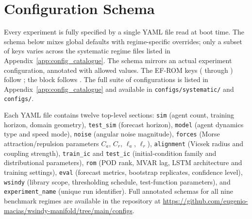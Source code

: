 \chapter{Configuration Schema}
\label{app:config_schema}
Every experiment is fully specified by a single YAML file read at boot time.
The schema below mixes global defaults with regime-specific
overrides; only a subset of keys varies across the systematic regime files
listed in Appendix~\ref{app:config_catalogue}.
The schema mirrors an actual experiment configuration,
annotated with allowed values.
The EF-ROM keys ( through ) follow
; the  block follows
.
The full suite of configurations is listed in Appendix~\ref{app:config_catalogue}
and available in \texttt{configs/systematic/} and \texttt{configs/}.

Each YAML file contains twelve top-level sections:
\texttt{sim} (agent count, training horizon, domain geometry),
\texttt{test\_sim} (forecast horizon),
\texttt{model} (agent dynamics type and speed mode),
\texttt{noise} (angular noise magnitude),
\texttt{forces} (Morse attraction/repulsion parameters $C_a$, $C_r$, $\ell_a$, $\ell_r$),
\texttt{alignment} (Vicsek radius and coupling strength),
\texttt{train\_ic} and \texttt{test\_ic} (initial-condition family and distributional parameters),
\texttt{rom} (POD rank, MVAR lag, LSTM architecture and training settings),
\texttt{eval} (forecast metrics, bootstrap replicates, confidence level),
\texttt{wsindy} (library scope, thresholding schedule, test-function parameters),
and \texttt{experiment\_name} (unique run identifier).
Full annotated schemas for all nine benchmark regimes are
available in the repository at
\url{https://github.com/eugenio-macias/wsindy-manifold/tree/main/configs}.

